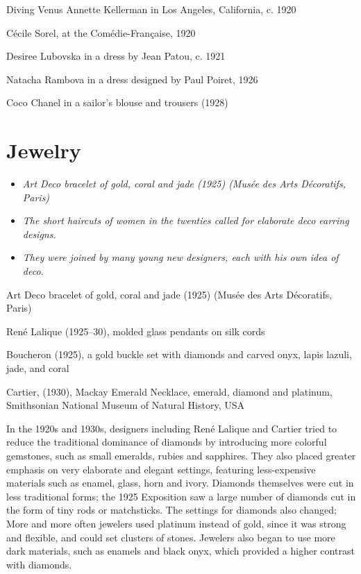 Diving Venus Annette Kellerman in Los Angeles, California, c. 1920

Cécile Sorel, at the Comédie-Française, 1920

Desiree Lubovska in a dress by Jean Patou, c. 1921

Natacha Rambova in a dress designed by Paul Poiret, 1926

Coco Chanel in a sailor's blouse and trousers (1928)

\section{Jewelry}\label{jewelry}

\begin{itemize}
\item
  \emph{Art Deco bracelet of gold, coral and jade (1925) (Musée des Arts
  Décoratifs, Paris)}
\item
  \emph{The short haircuts of women in the twenties called for elaborate
  deco earring designs.}
\item
  \emph{They were joined by many young new designers, each with his own
  idea of deco.}
\end{itemize}

Art Deco bracelet of gold, coral and jade (1925) (Musée des Arts
Décoratifs, Paris)

René Lalique (1925--30), molded glass pendants on silk cords

Boucheron (1925), a gold buckle set with diamonds and carved onyx, lapis
lazuli, jade, and coral

Cartier, (1930), Mackay Emerald Necklace, emerald, diamond and platinum,
Smithsonian National Museum of Natural History, USA

In the 1920s and 1930s, designers including René Lalique and Cartier
tried to reduce the traditional dominance of diamonds by introducing
more colorful gemstones, such as small emeralds, rubies and sapphires.
They also placed greater emphasis on very elaborate and elegant
settings, featuring less-expensive materials such as enamel, glass, horn
and ivory. Diamonds themselves were cut in less traditional forms; the
1925 Exposition saw a large number of diamonds cut in the form of tiny
rods or matchsticks. The settings for diamonds also changed; More and
more often jewelers used platinum instead of gold, since it was strong
and flexible, and could set clusters of stones. Jewelers also began to
use more dark materials, such as enamels and black onyx, which provided
a higher contrast with diamonds.

